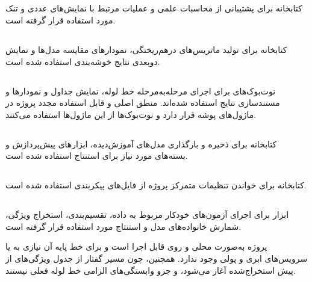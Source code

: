 \documentclass[12pt,a4paper,oneside]{report}
\begin{document}
\subsection*{}

کتابخانه
برای پشتیبانی از محاسبات علمی و عملیات مرتبط با نمایش‌های عددی و تنک مورد استفاده قرار گرفته است.


\subsection*{}

کتابخانه
برای تولید ماتریس‌های درهم‌ریختگی، نمودارهای مقایسه مدل‌ها و نمایش دوبعدی نتایج خوشه‌بندی استفاده شده است.


\subsection*{}

نوت‌بوک‌های
برای اجرای مرحله‌به‌مرحله خط لوله، نمایش جداول و نمودارها و مستندسازی نتایج استفاده شده‌اند. منطق اصلی و قابل استفاده مجدد پروژه در ماژول‌های پوشه
قرار دارد و نوت‌بوک‌ها از این ماژول‌ها استفاده می‌کنند.


\subsection*{}

کتابخانه
برای ذخیره و بارگذاری مدل‌های آموزش‌دیده، ابزارهای پیش‌پردازش و بسته‌های مورد نیاز برای استنتاج استفاده شده است.


\subsection*{}

کتابخانه
برای خواندن تنظیمات متمرکز پروژه از فایل‌های پیکربندی استفاده شده است.


\subsection*{}

ابزار
برای اجرای آزمون‌های خودکار مربوط به داده، تقسیم‌بندی، استخراج ویژگی، شمارش خانواده‌های مدل و استنتاج مورد استفاده قرار گرفته است.

پروژه به‌صورت محلی و روی
قابل اجرا است و برای خط پایه آن نیازی به
یا سرویس‌های ابری و پولی وجود ندارد. همچنین، چون مسیر گفتار از جدول ویژگی‌های از پیش استخراج‌شده آغاز می‌شود،
و
جزو وابستگی‌های الزامی خط لوله فعلی نیستند.
\end{document}
